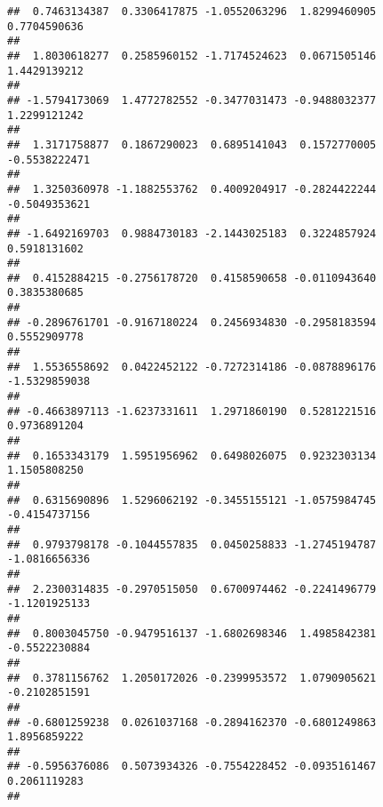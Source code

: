 \documentclass[]{article}
\begin{document}
\begin{verbatim}
##  0.7463134387  0.3306417875 -1.0552063296  1.8299460905  0.7704590636 
##                                                                       
##  1.8030618277  0.2585960152 -1.7174524623  0.0671505146  1.4429139212 
##                                                                       
## -1.5794173069  1.4772782552 -0.3477031473 -0.9488032377  1.2299121242 
##                                                                       
##  1.3171758877  0.1867290023  0.6895141043  0.1572770005 -0.5538222471 
##                                                                       
##  1.3250360978 -1.1882553762  0.4009204917 -0.2824422244 -0.5049353621 
##                                                                       
## -1.6492169703  0.9884730183 -2.1443025183  0.3224857924  0.5918131602 
##                                                                       
##  0.4152884215 -0.2756178720  0.4158590658 -0.0110943640  0.3835380685 
##                                                                       
## -0.2896761701 -0.9167180224  0.2456934830 -0.2958183594  0.5552909778 
##                                                                       
##  1.5536558692  0.0422452122 -0.7272314186 -0.0878896176 -1.5329859038 
##                                                                       
## -0.4663897113 -1.6237331611  1.2971860190  0.5281221516  0.9736891204 
##                                                                       
##  0.1653343179  1.5951956962  0.6498026075  0.9232303134  1.1505808250 
##                                                                       
##  0.6315690896  1.5296062192 -0.3455155121 -1.0575984745 -0.4154737156 
##                                                                       
##  0.9793798178 -0.1044557835  0.0450258833 -1.2745194787 -1.0816656336 
##                                                                       
##  2.2300314835 -0.2970515050  0.6700974462 -0.2241496779 -1.1201925133 
##                                                                       
##  0.8003045750 -0.9479516137 -1.6802698346  1.4985842381 -0.5522230884 
##                                                                       
##  0.3781156762  1.2050172026 -0.2399953572  1.0790905621 -0.2102851591 
##                                                                       
## -0.6801259238  0.0261037168 -0.2894162370 -0.6801249863  1.8956859222 
##                                                                       
## -0.5956376086  0.5073934326 -0.7554228452 -0.0935161467  0.2061119283 
##                                                                       

\end{verbatim}
\end{document}
